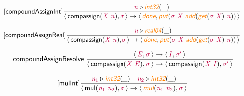 \documentclass[10pt,leqno,fleqn]{article}
\newcommand{\artVariable}[1]{\mbox{\color{purple}\em #1\/}}
\newcommand{\artConstructor}[1]{\mbox{\sf #1}}
\newcommand{\artSpecial}[1]{\mbox{\color{orange}\sf\em #1}}
\begin{document}
\begin{equation}
\tag*{[\artConstructor{\sf compoundAssignInt}]}
\begin{split}\frac{ \artVariable{n}\triangleright \artSpecial{int32}(\_) }{\langle\, \artConstructor{\sf compassign}(\artVariable{X}\ \artVariable{n}), \artVariable{$\sigma$}\,\rangle \rightarrow \langle\, \artSpecial{done}, \artSpecial{put}(\artVariable{$\sigma$}\ \artVariable{X}\ \artSpecial{add}(\artSpecial{get}(\artVariable{$\sigma$}\ \artVariable{X})\ \artVariable{n}))\,\rangle }
\end{split}
\end{equation}

\begin{equation}
\tag*{[\artConstructor{\sf compoundAssignReal}]}
\begin{split}\frac{ \artVariable{n}\triangleright \artSpecial{real64}(\_) }{\langle\, \artConstructor{\sf compassign}(\artVariable{X}\ \artVariable{n}), \artVariable{$\sigma$}\,\rangle \rightarrow \langle\, \artSpecial{done}, \artSpecial{put}(\artVariable{$\sigma$}\ \artVariable{X}\ \artSpecial{add}(\artSpecial{get}(\artVariable{$\sigma$}\ \artVariable{X})\ \artVariable{n}))\,\rangle }
\end{split}
\end{equation}

\begin{equation}
\tag*{[\artConstructor{\sf compoundAssignResolve}]}
\begin{split}\frac{\langle\, \artVariable{E}, \artVariable{$\sigma$}\,\rangle \rightarrow \langle\, \artVariable{I}, \artVariable{$\sigma$\/$^\prime$}\,\rangle }{\langle\, \artConstructor{\sf compassign}(\artVariable{X}\ \artVariable{E}), \artVariable{$\sigma$}\,\rangle \rightarrow \langle\, \artConstructor{\sf compassign}(\artVariable{X}\ \artVariable{I}), \artVariable{$\sigma$\/$^\prime$}\,\rangle }
\end{split}
\end{equation}

\begin{equation}
\tag*{[\artConstructor{\sf mulInt}]}
\begin{split}\frac{ \artVariable{n$_{1}$}\triangleright \artSpecial{int32}(\_) \quad  \artVariable{n$_{2}$}\triangleright \artSpecial{int32}(\_) }{\langle\, \artConstructor{\sf mul}(\artVariable{n$_{1}$}\ \artVariable{n$_{2}$}), \artVariable{$\sigma$}\,\rangle \rightarrow \langle\, \artSpecial{mul}(\artVariable{n$_{1}$}\ \artVariable{n$_{2}$}), \artVariable{$\sigma$}\,\rangle }
\end{split}
\end{equation}
\end{document}
